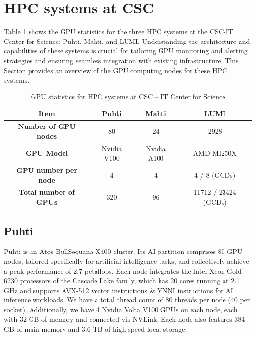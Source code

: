 
\section{HPC systems at CSC}
Table \ref{tab:gpu_details} shows the GPU statistics for the three HPC systems at the CSC-IT Center for Science: Puhti, Mahti, and LUMI. Understanding the architecture and capabilities of these systems is crucial for tailoring GPU monitoring and alerting strategies and ensuring seamless integration with existing infrastructure. This Section provides an overview of the GPU computing nodes for these HPC systems.

\begin{table}[H]
    \centering
    \begin{tabular}{|c|ccc|}
     \hline
     \textbf{Item} & \textbf{Puhti} & \textbf{Mahti} & \textbf{LUMI} \\
     \hline
     \textbf{Number of GPU nodes} & 80 & 24 & 2928 \\
     \hline
     \textbf{GPU Model} & Nvidia V100 & Nvidia A100 & AMD MI250X \\
     \hline
     \textbf{GPU number per node} & 4 & 4 & 4 / 8 (GCDs) \\
     \hline
     \textbf{Total number of GPUs} & 320 & 96 & 11712 / 23424 (GCDs) \\
     \hline
    \end{tabular}
    \caption{GPU statistics for HPC systems at CSC -- IT Center for Science}
    \label{tab:gpu_details}
\end{table}

\subsection{Puhti}
Puhti \cite{puhti} is an Atos BullSequana X400 cluster. Its AI partition comprises 80 GPU nodes, tailored specifically for artificial intelligence tasks, and collectively achieve a peak performance of 2.7 petaflops. Each node integrates the Intel Xeon Gold 6230 processors of the Cascade Lake family, which has 20 cores running at 2.1 GHz and supports AVX-512 vector instructions \& VNNI instructions for AI inference workloads. We have a total thread count of 80 threads per node (40 per socket). Additionally, we have 4 Nvidia Volta V100 GPUs on each node, each with 32 GB of memory and connected via NVLink. Each node also features 384 GB of main memory and 3.6 TB of high-speed local storage.

